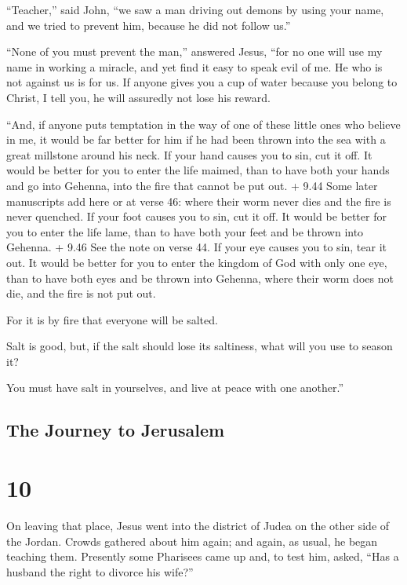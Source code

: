  ``Teacher,'' said John, ``we saw a man driving out demons
by using your name, and we tried to prevent him, because he did not
follow us.''

 ``None of you must prevent the man,'' answered Jesus,
``for no one will use my name in working a miracle, and yet find it easy
to speak evil of me.  He who is not against us is for us.
 If anyone gives you a cup of water because you belong to
Christ, I tell you, he will assuredly not lose his reward.

 ``And, if anyone puts temptation in the way of one of
these little ones who believe in me, it would be far better for him if
he had been thrown into the sea with a great millstone around his neck.
 If your hand causes you to sin, cut it off. It would be
better for you to enter the life maimed, than to have both your hands
and go into Gehenna, into the fire that cannot be put out. 
+ 9.44 Some later manuscripts add here or at verse 46: where their worm
never dies and the fire is never quenched.  If your foot
causes you to sin, cut it off. It would be better for you to enter the
life lame, than to have both your feet and be thrown into Gehenna.
 + 9.46 See the note on verse 44.  If your eye
causes you to sin, tear it out. It would be better for you to enter the
kingdom of God with only one eye, than to have both eyes and be thrown
into Gehenna,  where their worm does not die, and the fire
is not put out.

 For it is by fire that everyone will be salted.

 Salt is good, but, if the salt should lose its saltiness,
what will you use to season it?

You must have salt in yourselves, and live at peace with one another.''

\hypertarget{the-journey-to-jerusalem}{%
\subsection{The Journey to Jerusalem}\label{the-journey-to-jerusalem}}

\hypertarget{section-9}{%
\section{10}\label{section-9}}

 On leaving that place, Jesus went into the district of
Judea on the other side of the Jordan. Crowds gathered about him again;
and again, as usual, he began teaching them.  Presently some
Pharisees came up and, to test him, asked, ``Has a husband the right to
divorce his wife?''

